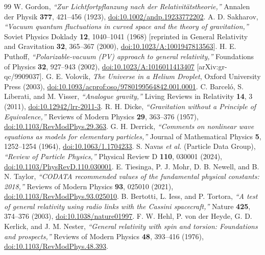 \documentclass[10pt,aps,prd,twocolumn,superscriptaddress,nofootinbib,floatfix,longbibliography,showkeys]{revtex4-2}
\begin{document}
\begin{thebibliography}{99}
 W. Gordon, \textit{``Zur Lichtfortpflanzung nach der Relativit\"atstheorie,''} Annalen der Physik \textbf{377}, 421--456 (1923), \href{https://doi.org/10.1002/andp.19233772202}{doi:10.1002/andp.19233772202}.
 A. D. Sakharov, \textit{``Vacuum quantum fluctuations in curved space and the theory of gravitation,''} Soviet Physics Doklady \textbf{12}, 1040--1041 (1968) [reprinted in General Relativity and Gravitation \textbf{32}, 365--367 (2000), \href{https://doi.org/10.1023/A:1001947813563}{doi:10.1023/A:1001947813563}].
 H. E. Puthoff, \textit{``Polarizable-vacuum (PV) approach to general relativity,''} Foundations of Physics \textbf{32}, 927--943 (2002), \href{https://doi.org/10.1023/A:1016011413407}{doi:10.1023/A:1016011413407} [arXiv:gr-qc/9909037].
 G. E. Volovik, \textit{The Universe in a Helium Droplet}, Oxford University Press (2003), \href{https://doi.org/10.1093/acprof:oso/9780199564842.001.0001}{doi:10.1093/acprof:oso/9780199564842.001.0001}.
 C. Barcel\'o, S. Liberati, and M. Visser, \textit{``Analogue gravity,''} Living Reviews in Relativity \textbf{14}, 3 (2011), \href{https://doi.org/10.12942/lrr-2011-3}{doi:10.12942/lrr-2011-3}.
 R. H. Dicke, \textit{``Gravitation without a Principle of Equivalence,''} Reviews of Modern Physics \textbf{29}, 363--376 (1957), \href{https://doi.org/10.1103/RevModPhys.29.363}{doi:10.1103/RevModPhys.29.363}.
 G. H. Derrick, \textit{``Comments on nonlinear wave equations as models for elementary particles,''} Journal of Mathematical Physics \textbf{5}, 1252--1254 (1964), \href{https://doi.org/10.1063/1.1704233}{doi:10.1063/1.1704233}.
 S. Navas \textit{et al.} (Particle Data Group), \textit{``Review of Particle Physics,''} Physical Review D \textbf{110}, 030001 (2024), \href{https://doi.org/10.1103/PhysRevD.110.030001}{doi:10.1103/PhysRevD.110.030001}.
 E. Tiesinga, P. J. Mohr, D. B. Newell, and B. N. Taylor, \textit{``CODATA recommended values of the fundamental physical constants: 2018,''} Reviews of Modern Physics \textbf{93}, 025010 (2021), \href{https://doi.org/10.1103/RevModPhys.93.025010}{doi:10.1103/RevModPhys.93.025010}.
 B. Bertotti, L. Iess, and P. Tortora, \textit{``A test of general relativity using radio links with the Cassini spacecraft,''} Nature \textbf{425}, 374--376 (2003), \href{https://doi.org/10.1038/nature01997}{doi:10.1038/nature01997}.
 F. W. Hehl, P. von der Heyde, G. D. Kerlick, and J. M. Nester, \textit{``General relativity with spin and torsion: Foundations and prospects,''} Reviews of Modern Physics \textbf{48}, 393--416 (1976), \href{https://doi.org/10.1103/RevModPhys.48.393}{doi:10.1103/RevModPhys.48.393}.

\end{thebibliography}
\end{document}
